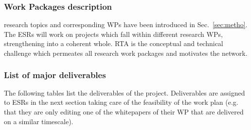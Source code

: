 %

\subsubsection{Work Packages description}\label{sec:WPdescription}
\label{sub:WPsDescription}

\acronym research topics and corresponding WPs have been introduced in Sec.~\ref{sec:metho}. 
The ESRs will work on projects which fall within different research WPs, strengthening \acronym into a coherent whole.
RTA is the conceptual and technical challenge which permeates all research work packages and motivates the network.
\vspace{-5mm}

\FloatBarrier

\subsubsection{List of major deliverables}
\label{sub:deliverables}

The following tables list the deliverables of the project. Deliverables are assigned to ESRs in the next section taking care of the feasibility of the work plan (e.g. that they are only editing one of the whitepapers of their WP that are delivered on a similar timescale). 

